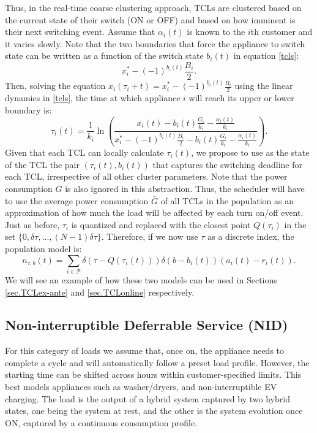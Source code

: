 \documentclass[10pt]{IEEEtran}
\begin{document}
Thus, in the real-time coarse clustering approach, TCLs are clustered based on the current state of their switch (ON or OFF) and based on how imminent is their next switching event. Assume that $\alpha_i(t)$ is known to the $i$th customer and it varies slowly. Note that the two boundaries that force the appliance to switch state can be written as a function of the switch state $b_i(t)$ in equation \eqref{tcls}:
$$x_i^*-(-1)^{b_i(t)}\frac{B_i}{2}.$$
Then, solving the equation $x_i(\tau_{i}+t)=x_i^*-(-1)^{b_i(t)}\frac{B_i}{2}$ using the linear dynamics in \eqref{tcls}, the time at which appliance $i$ will reach
its upper or lower boundary is:
\begin{equation}
\tau_{i}(t)=\frac 1 {k_i}\ln\left(
\frac{x_i(t)-b_i(t)\frac{G_i}{k_i}-\frac{\alpha_i(t)}{k_i}}
{x_i^*-(-1)^{b_i(t)}\frac{B_i}{2}-b_i(t)\frac{G_i}{k_i}-\frac{\alpha_i(t)}{k_i}}
\right).
\end{equation}
Given that each TCL can locally calculate $\tau_{i}(t)$, we propose to use as the state of the TCL the pair
$(\tau_{i}(t),b_i(t))$ that captures the switching deadline for each TCL, irrespective of all other cluster parameters. Note that the power consumption $G$ is also ignored in this abstraction. Thus, the scheduler will have to use the average power consumption $\bar{G}$ of all TCLs in the population as an approximation of how much the load will be affected by each turn on/off event.
Just as before, $\tau_i$ is quantized and replaced with the closest  point $Q(\tau_i)$ 
in the set $\{0,\delta \tau,\ldots,(N-1)\delta \tau\}$.
Therefore, if we now use $\tau$ as a discrete index, the population model is:
\begin{equation}\label{coarsecluster}
n_{\tau,b}(t)=\sum_{i\in {\mathcal P}} \delta(\tau-Q(\tau_i(t)))\delta(b-b_i(t))(a_i(t) - r_i(t)).
\end{equation}
We will see an example of how these two models can be used in Sections \ref{sec.TCLex-ante} and \ref{sec.TCLonline} respectively.

\subsection{ Non-interruptible Deferrable Service (NID)}\label{cat4}
For this category of loads we assume that, once on, the appliance needs to complete a cycle and will automatically follow a preset load profile. However, the starting time can be shifted across hours within customer-specified limits. This best models appliances such as washer/dryers, and non-interruptible EV charging. The load is the output of a hybrid system captured by two hybrid states, one being the system at rest, and the other is the system evolution once ON, captured by a continuous consumption profile.
\end{document}
